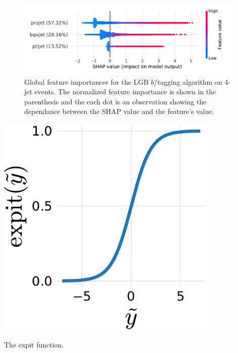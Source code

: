 \begin{figure}[h!]
  \centerfloat
  \includegraphics[width=0.98\textwidth, trim=10 10 20 10, clip]{figures/quarks/shap_global-down_sample=1.00-ML_vars=vertex-selection=b-ejet_min=4-n_iter_RS_lgb=99-n_iter_RS_xgb=9-cdot_cut=0.90-version=19-njet=4.pdf}
  \caption[Global Feature Importances for the LGB $b$\=/Tagging Algorithm on 4-Jet Events]
          {Global feature importances for the LGB $b$\=/tagging algorithm on 4-jet events. The normalized feature importance is shown in the parenthesis and the each dot is an observation showing the dependance between the SHAP value and the feature's value. 
          } 
  \label{fig:q:shap_btag_global_4j}
\end{figure}

\begin{marginfigure}[3cm]
  \centerfloat
  \includegraphics[width=0.8\textwidth]{figures/logit_expit/expit.pdf}
  \caption[The expit Function]
          {The expit function.} 
  \label{fig:q:expit}
\end{marginfigure}

